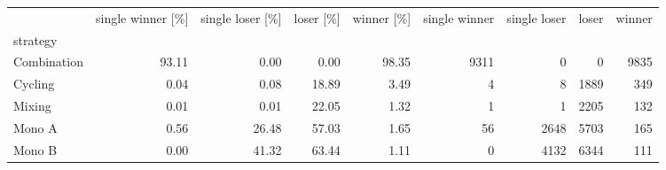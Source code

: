 \begin{tabular}{lrrrrrrrr}
\toprule
 & single winner [\%] & single loser [\%] & loser [\%] & winner [\%] & single winner & single loser & loser & winner \\
strategy &  &  &  &  &  &  &  &  \\
\midrule
Combination & 93.11 & 0.00 & 0.00 & 98.35 & 9311 & 0 & 0 & 9835 \\
Cycling & 0.04 & 0.08 & 18.89 & 3.49 & 4 & 8 & 1889 & 349 \\
Mixing & 0.01 & 0.01 & 22.05 & 1.32 & 1 & 1 & 2205 & 132 \\
Mono A & 0.56 & 26.48 & 57.03 & 1.65 & 56 & 2648 & 5703 & 165 \\
Mono B & 0.00 & 41.32 & 63.44 & 1.11 & 0 & 4132 & 6344 & 111 \\
\bottomrule
\end{tabular}
